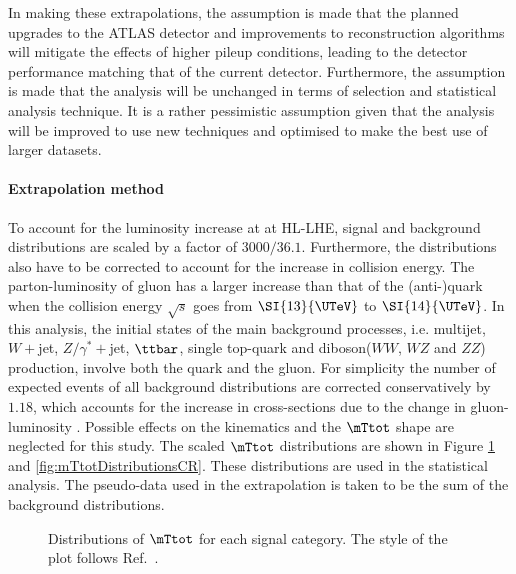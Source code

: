 In making these extrapolations, the assumption is made that the planned upgrades to the ATLAS detector 
and improvements to reconstruction algorithms will mitigate the effects of higher pileup conditions, 
leading to the detector performance matching that of the current detector. Furthermore, the assumption 
is made that the analysis will be unchanged in terms of selection and statistical analysis technique. 
It is a rather pessimistic assumption given that the analysis will be improved to use new techniques 
and optimised to make the best use of larger datasets.

\paragraph{Extrapolation method}
\label{sec:extrapolation method}
To account for the luminosity increase at at HL-LHE, signal and background distributions are scaled 
by a factor of $3000/36.1$.
Furthermore, the distributions also have to be corrected to account for the increase in collision energy. 
The parton-luminosity of gluon has a larger increase than that of the (anti-)quark when the collision energy 
$\sqrt{s}$ goes from $\SI{13}{\UTeV}$ to $\SI{14}{\UTeV}$.
In this analysis, the initial states of the main background processes, i.e. multijet, $W+$jet, $Z/\gamma^{*}+$jet, $\ttbar$, 
single top-quark and diboson($WW$, $WZ$ and $ZZ$) production, involve both the quark and the gluon. 
For simplicity the number of expected events of all background distributions are corrected conservatively by $1.18$, 
which accounts for the increase in cross-sections due to the change in gluon-luminosity \cite{Heinemeyer:2013tqa}. 
Possible effects on the kinematics and the $\mTtot$ shape are neglected for this study. The scaled $\mTtot$ 
distributions are shown in Figure \ref{fig:mTtotDistributionsSR} and \ref{fig:mTtotDistributionsCR}. 
These distributions are used in the statistical analysis. The pseudo-data used in the extrapolation is 
taken to be the sum of the background distributions.

\begin{figure}[!ht]
    \centering
        \qquad
        \qquad
        \qquad
        \caption{Distributions of $\mTtot$ for each signal category. The style of the plot follows Ref.~\cite{ATLASRun2Ditau}. }

    \label{fig:mTtotDistributionsSR}
\end{figure}


